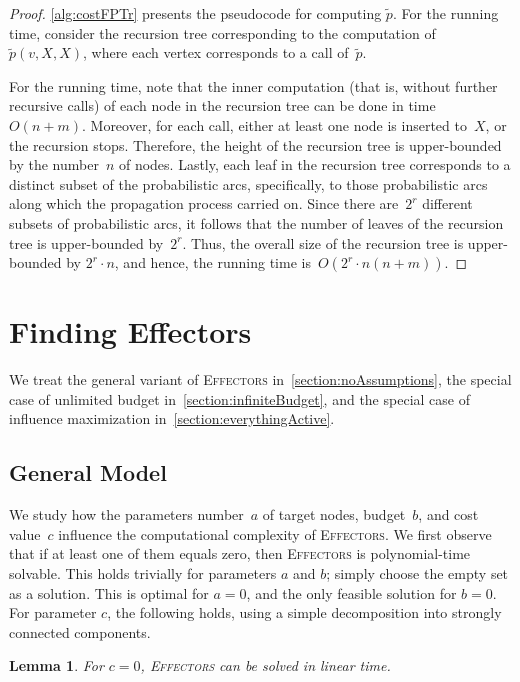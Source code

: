 \documentclass{article}
\newtheorem{lemma}{Lemma}
\newcommand{\probEffectors}{\textsc{Effectors}\xspace}
\begin{document}
\begin{proof}
  \autoref{alg:costFPTr} presents the pseudocode for computing $\tilde{p}$.
  For the running time, consider the recursion tree corresponding to
  the computation of~$\tilde{p}(v,X,X)$, where each vertex corresponds
  to a call of~$\tilde{p}$.
  
  For the running time,
  note that the inner computation (that is, without further recursive calls) of each node in the recursion tree
  can be done in time $O(n + m)$.  
  Moreover, for each call, either at least one node is inserted to~$X$,
  or the recursion stops.
  Therefore, the height of the recursion tree is upper-bounded by the number~$n$ of nodes.
  Lastly, each leaf in the recursion tree corresponds to a distinct subset of the probabilistic arcs,
  specifically, to those probabilistic arcs along which the propagation process carried on.
  Since there are~$2^r$ different subsets of probabilistic arcs,
  it follows that the number of leaves of the recursion tree is upper-bounded by~$2^r$.
  Thus, the overall size of the recursion tree is upper-bounded by $2^r \cdot n$,
  and hence,
  the running time is~$O(2^r \cdot n (n + m))$.
\end{proof}

\section{Finding Effectors}\label{section:findingEffectors}
We treat the general variant of \probEffectors in~\autoref{section:noAssumptions}, 
the special case of unlimited budget in~\autoref{section:infiniteBudget},
and the special case of influence maximization 
in~\autoref{section:everythingActive}.

\subsection{General Model}\label{section:noAssumptions}
We study how the parameters number~$a$ of target nodes, budget~$b$, and cost value~$c$ influence the computational complexity of \probEffectors.
We first observe that if at least one of them equals zero, then
\probEffectors is polynomial-time solvable.
This holds trivially for parameters $a$ and $b$; simply choose the
empty set as a solution.
This is optimal for $a = 0$, and the only feasible solution for $b = 0$.
For parameter $c$, the following holds, using a simple decomposition into 
strongly connected components.

\begin{lemma}\label{lem:det_c0_p}
  For $c = 0$, \probEffectors can be solved in linear time.
\end{lemma}
\end{document}
